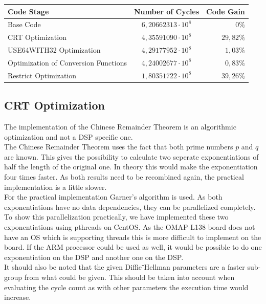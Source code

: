 \documentclass[a4paper]{article}
\begin{document}
\begin{center}
    \begin{tabular}{| l | c | r |}
        \hline
        Code Stage & Number of Cycles & Code Gain \\ \hline
        Base Code & $6,20662313 \cdot 10^{8}$ 	& $0\%$ \\
        CRT Optimization & $4,35591090 \cdot 10^{8}$ & $29,82\%$ \\
        USE64WITH32 Optimization 	& $4,29177952 \cdot 10^{8}$ & $1,03\%$ \\
        Optimization of Conversion Functions & $4,24002677 \cdot 10^{8}$ & $0,83\%$ \\
        Restrict Optimization	 & $1,80351722 \cdot 10^{8}$ & $39,26\%$ \\
        \hline
    \end{tabular}
\end{center}

\subsection{CRT Optimization}
The implementation of the Chinese Remainder Theorem is an algorithmic optimization and not a DSP specific one.\\

The Chinese Remainder Theorem uses the fact that both prime numbers $p$ and $q$ are known. This gives the possibility to calculate two seperate exponentiations of half the length of the original one. In theory this would make the exponentiation four times faster. As both results need to be recombined again, the practical implementation is a little slower.\\

For the practical implementation Garner's algorithm is used. As both exponentiations have no data dependencies, they can be parallelized completely. To show this parallelization practically, we have implemented these two exponentiations using pthreads on CentOS. As the OMAP-L138 board does not have an OS which is supporting threads this is more difficult to implement on the board. If the ARM processor could be used as well, it would be possible to do one exponentiation on the DSP and another one on the DSP. \\

It should also be noted that the given Diffie⁻Hellman parameters are a faster sub-group from what could be given. This should be taken into account when evaluating the cycle count as with other parameters the execution time would increase.\\
\end{document}
